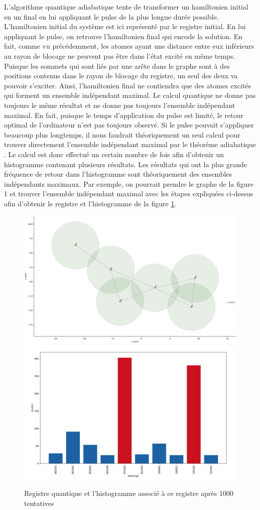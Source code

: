\documentclass[11pt]{article}
\begin{document}
L'algorithme quantique adiabatique tente de transformer un hamiltonien initial en un final en lui appliquant le pulse de la plus longue durée possible. L'hamiltonien initial du système est ici représenté par le registre initial. En lui appliquant le pulse, on retrouve l'hamiltonien final qui encode la solution. En fait, comme vu précédemment, les atomes ayant une distance entre eux inférieurs au rayon de blocage ne peuvent pas être dans l'état excité en même temps. Puisque les sommets qui sont liés par une arête dans le graphe sont à des positions contenus dans le rayon de blocage du registre, un seul des deux va pouvoir s'exciter. Ainsi, l'hamiltonien final ne contiendra que des atomes excités qui forment un ensemble indépendant maximal. Le calcul quantique ne donne pas toujours le même résultat et ne donne pas toujours l'ensemble indépendant maximal. En fait, puisque  le temps d'application du pulse est limité, le retour optimal de l'ordinateur n'est pas toujours observé. Si le pulse pouvait s'appliquer beaucoup plus longtemps, il nous faudrait théoriquement un seul calcul pour trouver directement l'ensemble indépendant maximal par le théorème adiabatique \cite{amin_consistency_2009}. Le calcul est donc effectué un certain nombre de fois afin d'obtenir un histogramme contenant plusieurs résultats. Les résultats qui  ont la plus grande fréquence de retour dans l'histogramme sont théoriquement des ensembles indépendants maximaux. Par exemple, on pourrait prendre le graphe de la figure 1 et trouver l'ensemble indépendant maximal avec les étapes expliquées ci-dessus afin d'obtenir le registre et l'histogramme de la figure \ref{QMIS_exemple}.
\begin{figure}[H]
    \centering
    \includegraphics[width = 0.48\linewidth]{images/registre_exemple.png}
    \includegraphics[width=0.49\linewidth]{images/qaa_res.jpeg}
    \caption{Registre quantique et l'histogramme associé à ce registre après 1000 tentatives}
    \label{QMIS_exemple}
\end{figure}
    
\end{document}
